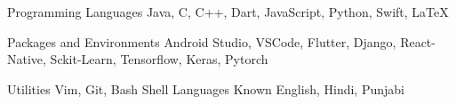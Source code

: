 \vspace{100mm}


\begin{cvskills}

  \cvskill
    {Programming Languages} %
    {Java, C, C++, Dart, JavaScript, Python, Swift, LaTeX} %

  \cvskill
    {Packages and Environments} %
    {Android Studio, VSCode, Flutter, Django, React-Native, Sckit-Learn, Tensorflow, Keras, Pytorch} %

  \cvskill
    {Utilities} %
    {Vim, Git, Bash Shell} %
  \cvskill
    {Languages Known} %
    {English, Hindi, Punjabi} %

\end{cvskills}